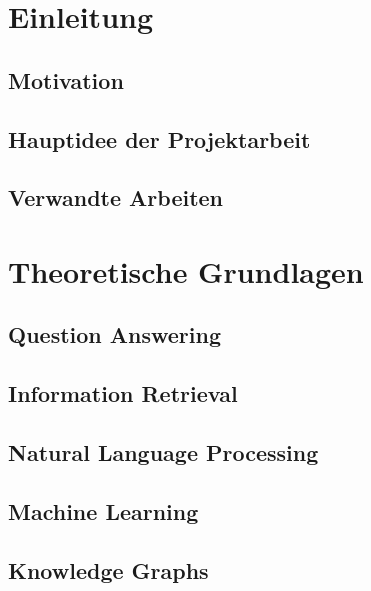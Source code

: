 \documentclass[
        ngerman,
        paper=a4,
        numbers=noendperiod,
]{scrreprt}
\begin{document}
\chapter{Einleitung}




\section{Motivation}

\section{Hauptidee der Projektarbeit}

\section{Verwandte Arbeiten}








\chapter{Theoretische Grundlagen}

\section{Question Answering}


\section{Information Retrieval}

\section{Natural Language Processing}


\section{Machine Learning}

\section{Knowledge Graphs}


\end{document}
